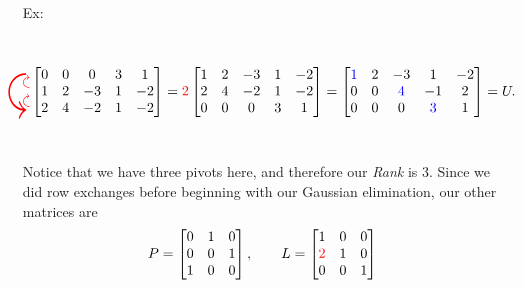 \documentclass[reqno]{amsart}
\theoremstyle{definition}
\begin{document}
\begin{enumerate}

\item[Ex:  ]
%
\begin{equation}
\begin{matrix}
\stackinset{l}{-10pt}{t}{20pt}{\resizebox{12pt}{35pt}{\curvearrowdown}}{}\\
\\
\\
\end{matrix}\begin{matrix}
\vspace*{-10pt}\\
\curvearrowup\\
\curvearrowup\\
\end{matrix}\begin{bmatrix}
0 & 0 & 0 & 3 & 1\\
1 & 2 & -3 & 1 & -2\\
2 & 4 & -2 & 1 & -2
\end{bmatrix} = \begin{matrix}
\\
{\color{red}2}\\
\\
\end{matrix}\begin{bmatrix}
1 & 2 & -3 & 1 & -2\\
2 & 4 & -2 & 1 & -2\\
0 & 0 & 0 & 3 & 1
\end{bmatrix} = \begin{bmatrix}
{\color{blue}1} & 2 & -3 & 1 & -2\\
0 & 0 & {\color{blue}4} & -1 & 2\\
0 & 0 & 0 & {\color{blue}3} & 1
\end{bmatrix} = U.
\end{equation}
%
Notice that we have three pivots here, and therefore our \emph{Rank} is 3.
Since we did row exchanges before beginning with our Gaussian elimination, our other matrices are
%
\begin{equation*}
P = \begin{bmatrix}
0 & 1 & 0\\
0 & 0 & 1\\
1 & 0 & 0
\end{bmatrix},\qquad
L = \begin{bmatrix}
1 & 0 & 0\\
{\color{red} 2} & 1 & 0\\
0 & 0 & 1
\end{bmatrix}
\end{equation*}


\end{enumerate}
\end{document}
